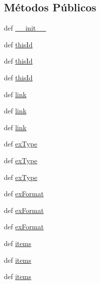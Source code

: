 \subsection*{Métodos Públicos}
\begin{DoxyCompactItemize}
\item 
def \hyperlink{classELO_1_1EntityUnit_1_1Exercise_a8e29c352a46fe192f7737bfa96d0e176}{\-\_\-\-\_\-init\-\_\-\-\_\-}
\item 
def \hyperlink{classELO_1_1EntityUnit_1_1Exercise_a16ee1a43f22c4d9f99f2a98fa02c016b}{this\-Id}
\item 
def \hyperlink{classELO_1_1EntityUnit_1_1Exercise_a16ee1a43f22c4d9f99f2a98fa02c016b}{this\-Id}
\item 
def \hyperlink{classELO_1_1EntityUnit_1_1Exercise_a16ee1a43f22c4d9f99f2a98fa02c016b}{this\-Id}
\item 
def \hyperlink{classELO_1_1EntityUnit_1_1Exercise_a9a140c7c2c9e4b90d1f40acfed62efd0}{link}
\item 
def \hyperlink{classELO_1_1EntityUnit_1_1Exercise_a9a140c7c2c9e4b90d1f40acfed62efd0}{link}
\item 
def \hyperlink{classELO_1_1EntityUnit_1_1Exercise_a9a140c7c2c9e4b90d1f40acfed62efd0}{link}
\item 
def \hyperlink{classELO_1_1EntityUnit_1_1Exercise_aee62dc52d043fce780716fb395d88131}{ex\-Type}
\item 
def \hyperlink{classELO_1_1EntityUnit_1_1Exercise_aee62dc52d043fce780716fb395d88131}{ex\-Type}
\item 
def \hyperlink{classELO_1_1EntityUnit_1_1Exercise_aee62dc52d043fce780716fb395d88131}{ex\-Type}
\item 
def \hyperlink{classELO_1_1EntityUnit_1_1Exercise_a5c495ffe5e6e424c1e4754dd07c06bc7}{ex\-Format}
\item 
def \hyperlink{classELO_1_1EntityUnit_1_1Exercise_a5c495ffe5e6e424c1e4754dd07c06bc7}{ex\-Format}
\item 
def \hyperlink{classELO_1_1EntityUnit_1_1Exercise_a5c495ffe5e6e424c1e4754dd07c06bc7}{ex\-Format}
\item 
def \hyperlink{classELO_1_1EntityUnit_1_1Exercise_a7e95e4287551ac552687fa5d0acb6305}{items}
\item 
def \hyperlink{classELO_1_1EntityUnit_1_1Exercise_a7e95e4287551ac552687fa5d0acb6305}{items}
\item 
def \hyperlink{classELO_1_1EntityUnit_1_1Exercise_a7e95e4287551ac552687fa5d0acb6305}{items}
\end{DoxyCompactItemize}

